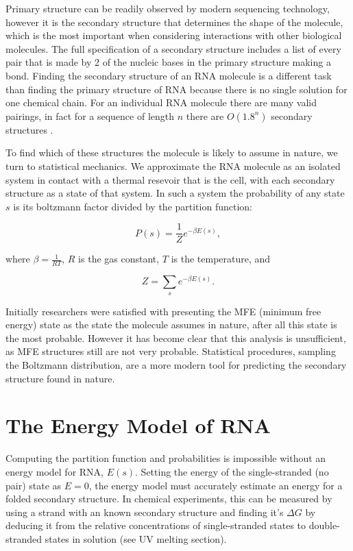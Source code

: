 Primary structure can be readily observed by modern sequencing
technology, however it is the secondary structure that determines the
shape of the molecule, which is the most important when considering
interactions with other biological molecules. The full specification
of a secondary structure includes a list of every pair that is made by
2 of the nucleic bases in the primary structure making a bond. Finding
the secondary structure of an RNA molecule is a different task than
finding the primary structure of RNA because there is no single
solution for one chemical chain. For an individual RNA molecule there
are many valid pairings, in fact for a sequence of length $n$ there
are $O(1.8^n)$ secondary structures \cite{hofacker1998combinatorics}. 

To find which of these structures the molecule is likely to assume in
nature, we turn to statistical mechanics. We approximate the RNA
molecule as an isolated system in contact with a thermal resevoir that
is the cell, with each secondary structure as a state of that
system. In such a system the probability of any state $s$ is its
boltzmann factor divided by the partition function:

\begin{equation}
P(s) = \frac{1}{Z} e^{-\beta E(s)},
\end{equation}

where $\beta = \frac{1}{RT}$, $R$ is the gas constant, $T$ is the
temperature, and

\begin{equation}
Z = \sum_{s} e^{-\beta E(s)}.
\end{equation}

Initially researchers were satisfied with presenting the MFE (minimum
free energy) state as the state the molecule assumes in nature, after
all this state is the most probable. However it has become clear that
this analysis is unsufficient, as MFE structures still are not very
probable. Statistical procedures, sampling the Boltzmann distribution,
are a more modern tool for predicting the secondary structure found in
nature. 

\section{The Energy Model of RNA}

Computing the partition function and probabilities is impossible
without an energy model for RNA, $E(s)$. Setting the energy of the
single-stranded (no pair) state as $E = 0$, the energy model must
accurately estimate an energy for a folded secondary structure. In
chemical experiments, this can be measured by using a strand with an
known secondary structure and finding it's $\Delta G$ by deducing it
from the relative concentrations of single-stranded states to
double-stranded states in solution (see UV melting section).

